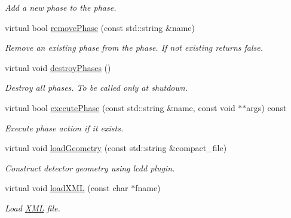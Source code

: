 \begin{DoxyCompactItemize}
\begin{DoxyCompactList}\small\item\em Add a new phase to the phase. \item\end{DoxyCompactList}\item 
virtual bool \hyperlink{class_d_d4hep_1_1_simulation_1_1_geant4_kernel_a3d2e1d38ae072b26c0a9124268065fbc}{removePhase} (const std::string \&name)
\begin{DoxyCompactList}\small\item\em Remove an existing phase from the phase. If not existing returns false. \item\end{DoxyCompactList}\item 
virtual void \hyperlink{class_d_d4hep_1_1_simulation_1_1_geant4_kernel_af8c01fc03cdb8db95fafe071eee0ba5a}{destroyPhases} ()
\begin{DoxyCompactList}\small\item\em Destroy all phases. To be called only at shutdown. \item\end{DoxyCompactList}\item 
virtual bool \hyperlink{class_d_d4hep_1_1_simulation_1_1_geant4_kernel_a9fbb49abf09139f19d21a5d5d83f2590}{executePhase} (const std::string \&name, const void $\ast$$\ast$args) const 
\begin{DoxyCompactList}\small\item\em Execute phase action if it exists. \item\end{DoxyCompactList}\item 
virtual void \hyperlink{class_d_d4hep_1_1_simulation_1_1_geant4_kernel_afe27ed5e3415cd381df461a28015ff81}{loadGeometry} (const std::string \&compact\_\-file)
\begin{DoxyCompactList}\small\item\em Construct detector geometry using lcdd plugin. \item\end{DoxyCompactList}\item 
virtual void \hyperlink{class_d_d4hep_1_1_simulation_1_1_geant4_kernel_aaaab733198f5e548e23c5b97dfd0aa32}{loadXML} (const char $\ast$fname)
\begin{DoxyCompactList}\small\item\em Load \hyperlink{namespace_d_d4hep_1_1_x_m_l}{XML} file. \item\end{DoxyCompactList}\item 
$$
\end{DoxyCompactItemize}
